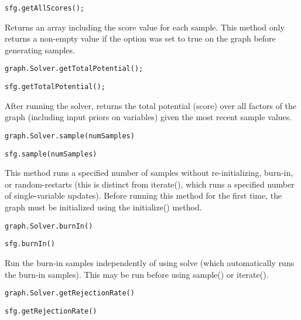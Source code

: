 \ifjava
\begin{lstlisting}
sfg.getAllScores();
\end{lstlisting}
\fi

Returns an array including the score value for each sample. This method only returns a non-empty value if the  option was set to true on the graph before generating samples.

\ifmatlab
\begin{lstlisting}
graph.Solver.getTotalPotential();
\end{lstlisting}
\fi

\ifjava
\begin{lstlisting}
sfg.getTotalPotential();
\end{lstlisting}
\fi

After running the solver, returns the total potential (score) over all factors of the graph (including input priors on variables) given the most recent sample values.

\ifmatlab
\begin{lstlisting}
graph.Solver.sample(numSamples)
\end{lstlisting}
\fi

\ifjava
\begin{lstlisting}
sfg.sample(numSamples)
\end{lstlisting}
\fi

This method runs a specified number of samples without re-initializing, burn-in, or random-restarts (this is distinct from iterate(), which runs a specified number of single-variable updates).  Before running this method for the first time, the graph must be initialized using the initialize() method.

\ifmatlab
\begin{lstlisting}
graph.Solver.burnIn()
\end{lstlisting}
\fi

\ifjava
\begin{lstlisting}
sfg.burnIn()
\end{lstlisting}
\fi

Run the burn-in samples independently of using solve (which automatically runs the burn-in samples).  This may be run before using sample() or iterate().

\ifmatlab
\begin{lstlisting}
graph.Solver.getRejectionRate()
\end{lstlisting}
\fi

\ifjava
\begin{lstlisting}
sfg.getRejectionRate()
\end{lstlisting}
\fi

